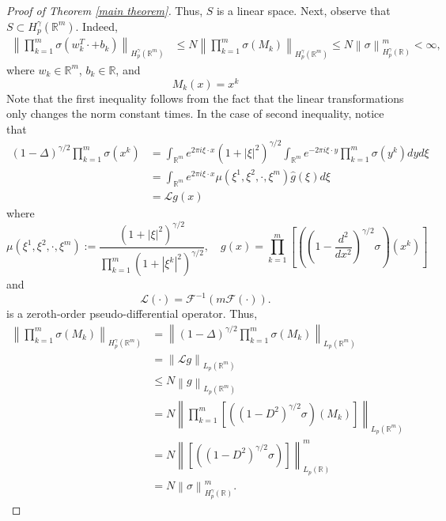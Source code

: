 \documentclass[11pt,reqno]{amsart}
\numberwithin{equation}{section}
\theoremstyle{remark}
\theoremstyle{definition}
\newcommand\bR{\mathbb{R}}
\newcommand\cF{\mathcal{F}}
\newcommand\cL{\mathcal{L}}
\begin{document}
\begin{proof}[Proof of Theorem \ref{main theorem}]
Thus, $S$ is a linear space. Next, observe that $S\subset H_p^\gamma(\bR^{m})$. Indeed,
\begin{equation*}
\begin{aligned}
\left\|   \prod_{k = 1}^{m} \sigma(w_{k}^{T}\cdot + b_{k})   \right\|_{H_{p}^{\gamma}(\bR^{m})}
& \leq N\left\|   \prod_{k = 1}^{m} \sigma(M_{k})   \right\|_{H_{p}^{\gamma}(\bR^{m})} 
\leq N\left\|    \sigma   \right\|_{H_{p}^{\gamma}(\bR)}^{m}<\infty,
\end{aligned}
\end{equation*}
where $w_{k}\in \bR^{m}$, $b_{k}\in \bR$, and 
\begin{equation*}
M_{k}(x) = x^{k}
\end{equation*} 
Note that the first inequality follows from the fact that the linear transformations only changes the norm constant times. In the case of second inequality, notice that
\begin{equation*}
\begin{aligned}
  (1-\Delta)^{\gamma/2}\prod_{k = 1}^{m} \sigma(x^{k})  
&= \int_{\bR^{m}} e^{2\pi i \xi \cdot x}(1+|\xi|^{2})^{\gamma/2}\int_{\bR^{m}} e^{-2\pi i \xi \cdot y} \prod_{k = 1}^{m}\sigma(y^{k}) dy d\xi  \\
&= \int_{\bR^{m}} e^{2\pi i \xi \cdot x} \mu(\xi^{1},\xi^{2},\cdot,\xi^{m}) \hat g(\xi) d\xi \\
&= \cL g(x)
\end{aligned}
\end{equation*}
where 
\begin{equation*}
\mu(\xi^{1},\xi^{2},\cdot,\xi^{m}) := \frac{(1+|\xi|^{2})^{\gamma/2}}{\prod_{k = 1}^{m} (1+|\xi^{k}|^{2})^{\gamma/2}}, \quad g(x) = \prod_{k = 1}^{m}\left[ \left( \left( 1-\frac{d^{2}}{dx^{2}} \right)^{\gamma/2}\sigma \right)(x^{k}) \right]
\end{equation*}
and 
\begin{equation*}
\cL(\cdot) = \cF^{-1}(m \cF(\cdot)).
\end{equation*}
is a zeroth-order pseudo-differential operator. Thus, 
\begin{equation*}
\begin{aligned}
\left\|   \prod_{k = 1}^{m} \sigma(M_{k})   \right\|_{H_{p}^{\gamma}(\bR^{m})} 
&= \left\|   (1-\Delta)^{\gamma/2} \prod_{k = 1}^{m} \sigma(M_{k})   \right\|_{L_{p}(\bR^{m})} \\
&= \left\| \cL g   \right\|_{L_{p}(\bR^{m})} \\
&\leq N\left\|  g   \right\|_{L_{p}(\bR^{m})} \\
&= N\left\| \prod_{k = 1}^{m}\left[ \left( (1-D^{2})^{\gamma/2}\sigma \right)(M_{k}) \right]   \right\|_{L_{p}(\bR^{m})} \\
&= N\left\| \left[ \left( (1-D^{2})^{\gamma/2}\sigma \right) \right]   \right\|_{L_{p}(\bR)}^{m} \\
&= N\left\| \sigma   \right\|_{H_{p}^{\gamma}(\bR)}^{m}.
\end{aligned}
\end{equation*}




\end{proof}
\end{document}
